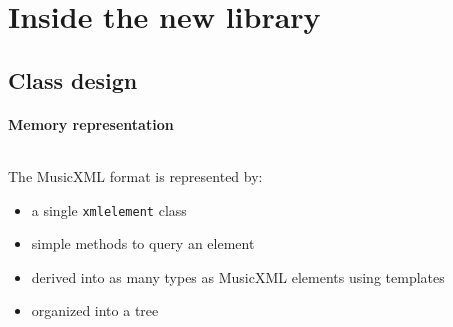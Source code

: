 \documentclass{beamer}
\begin{document}
\chapter{Inside the new library}
\section{Class design}
\begin{frame}
	\frametitle{Memory representation}
	\begin{columns}
		\begin{column}[c]{7cm}
		The MusicXML format is represented by:
		{\small
 			  \begin{itemize}
			  \item<1-> a single \texttt{xmlelement} class
			  \item<3-> simple methods to query an element
			  \item<5-> derived into as many types as MusicXML elements using templates
			  \item<7-> organized into a tree
			  \end{itemize}}
		\end{column}


\end{columns}
\end{frame}
\end{document}
